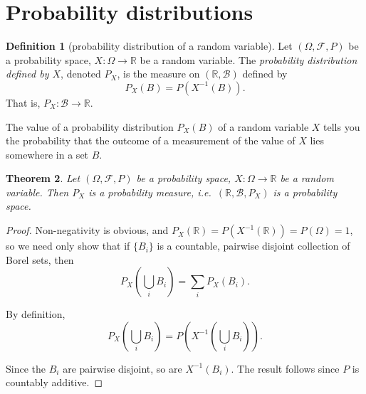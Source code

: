 \documentclass[a4paper,12pt]{scrreprt}
\newcommand{\R}{\mathbb{R}}
\theoremstyle{definition}
\newtheorem{definition}{Definition}
\theoremstyle{plain}
\newtheorem{theorem}[definition]{Theorem}
\theoremstyle{remark}
\begin{document}
\section{Probability distributions}
\begin{definition}[probability distribution of a random variable]
  \label{def:probabilitydistributionofrandomvariable}
  Let $(\Omega, \mathcal{F}, P)$ be a probability space, $X\colon \Omega \to \R$ be a random variable. The \emph{probability distribution defined by $X$}, denoted $P_{X}$, is the measure on $(\R, \mathcal{B})$ defined by
  \begin{equation*}
    P_{X}(B) = P(X^{-1}(B)).
  \end{equation*}
  That is, $P_{X}\colon \mathcal{B} \to \R$.
\end{definition}

The value of a probability distribution $P_{X}(B)$ of a random variable $X$ tells you the probability that the outcome of a measurement of the value of $X$ lies somewhere in a set $B$.

\begin{theorem}
  Let $(\Omega, \mathcal{F}, P)$ be a probability space, $X\colon \Omega \to \R$ be a random variable. Then $P_{X}$ is a probability measure, i.e.\ $(\R, \mathcal{B}, P_{X})$ is a probability space.
\end{theorem}
\begin{proof}
  Non-negativity is obvious, and $P_{X}(\R) = P(X^{-1}(\R)) = P(\Omega) = 1$, so we need only show that if $\{B_{i}\}$ is a countable, pairwise disjoint collection of Borel sets, then
  \begin{equation*}
    P_{X}\left( \bigcup_{i} B_{i} \right) = \sum_{i} P_{X}(B_{i}).
  \end{equation*}

  By definition,
  \begin{equation*}
    P_{X}\left( \bigcup_{i} B_{i} \right) = P\left( X^{-1}\left( \bigcup_{i} B_{i} \right) \right).
  \end{equation*}

  Since the $B_{i}$ are pairwise disjoint, so are $X^{-1}(B_{i})$. The result follows since $P$ is countably additive.
\end{proof}
\end{document}
